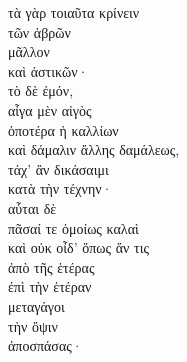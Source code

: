 {\large
\noindent τὰ γὰρ τοιαῦτα κρίνειν\\
\tabto{2em} τῶν ἁβρῶν \\
μᾶλλον \\
\tabto{2em} καὶ ἀστικῶν·\\
τὸ δὲ ἐμόν, \\
\tabto{2em} αἶγα μὲν αἰγὸς \\
\tabto{4em} ὁποτέρα ἡ καλλίων \\
\tabto{2em} καὶ δάμαλιν ἄλλης δαμάλεως, \\
\tabto{2em} τάχ' ἂν δικάσαιμι\\
\tabto{4em} κατὰ τὴν τέχνην·\\
\tabto{2em} αὗται δὲ \\
\tabto{4em} πᾶσαί τε ὁμοίως καλαὶ \\
\tabto{4em} καὶ οὐκ οἶδ' ὅπως ἄν τις \\
\tabto{6em} ἀπὸ τῆς ἑτέρας \\
\tabto{6em} ἐπὶ τὴν ἑτέραν \\
\tabto{4em} μεταγάγοι \\
\tabto{6em} τὴν ὄψιν \\
\tabto{4em} ἀποσπάσας·\\

}

